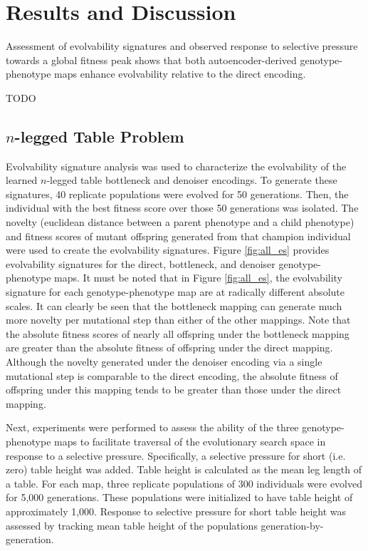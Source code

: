 \section{Results and Discussion} \label{sec:results}

Assessment of evolvability signatures and observed response to selective pressure towards a global fitness peak shows that both autoencoder-derived genotype-phenotype maps enhance evolvability relative to the direct encoding.

TODO


\subsection{$n$-legged Table Problem}



Evolvability signature analysis was used to characterize the evolvability of the learned $n$-legged table bottleneck and denoiser encodings.
To generate these signatures, 40 replicate populations were evolved for 50 generations.
Then, the individual with the best fitness score over those 50 generations was isolated.
The novelty (euclidean distance between a parent phenotype and a child phenotype) and fitness scores of mutant offspring generated from that champion individual were used to create the evolvability signatures.
Figure \ref{fig:all_es} provides evolvability signatures for the direct, bottleneck, and denoiser genotype-phenotype maps.
It must be noted that in Figure \ref{fig:all_es}, the evolvability signature for each genotype-phenotype map are at radically different absolute scales.
It can clearly be seen that the bottleneck mapping can generate much more novelty per mutational step than either of the other mappings.
Note that the absolute fitness scores of nearly all offspring under the bottleneck mapping are greater than the absolute fitness of offspring under the direct mapping.
Although the novelty generated under the denoiser encoding via a single mutational step is comparable to the direct encoding, the absolute fitness of offspring under this mapping tends to be greater than those under the direct mapping.

Next, experiments were performed to assess the ability of the three genotype-phenotype maps to facilitate traversal of the evolutionary search space in response to a selective pressure.
Specifically, a selective pressure for short (i.e. zero) table height was added.
Table height is calculated as the mean leg length of a table.
For each map, three replicate populations of 300 individuals were evolved for 5,000 generations.
These populations were initialized to have table height of approximately 1,000.
Response to selective pressure for short table height was assessed by tracking mean table height of the populations generation-by-generation.

